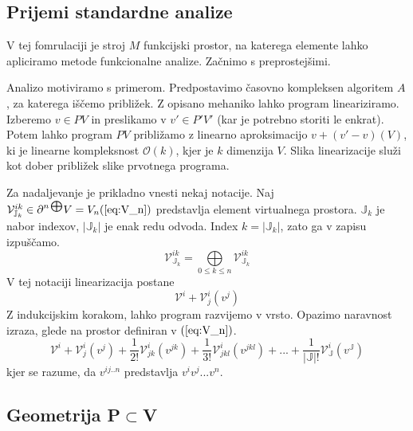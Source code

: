 \documentclass{article}
\newcommand{\JJ}{\mathbb{J}}
\newcommand{\VV}{\mathcal{V}}
\newcommand{\op}[1]{\partial^{#1\bigoplus}}
\begin{document}
 \subsection{Prijemi standardne analize}
 
 V tej fomrulaciji je stroj $M$ funkcijski prostor,  na katerega elemente lahko apliciramo metode funkcionalne analize. Začnimo s preprostejšimi.
 
 Analizo motiviramo s primerom. Predpostavimo časovno kompleksen algoritem $A$, za katerega iščemo približek. Z opisano mehaniko lahko program lineariziramo.
 Izberemo $v\in PV$ in preslikamo v $v'\in P'V'$ (kar je potrebno storiti le enkrat). Potem lahko program $PV$ približamo z linearno aproksimacijo $v+(v'-v) (V)$, ki je linearne kompleksnost $\mathcal{O}(k)$, kjer je $k$ dimenzija $V$.
 Slika linearizacije služi kot dober približek slike prvotnega programa.
 
 
 Za nadaljevanje je prikladno vnesti nekaj notacije. Naj $\VV^{ik}_{\JJ_k}\in\op{n}V=V_n (\ref{eq:V_n})$ predstavlja element virtualnega prostora. $\JJ_k$ je nabor indexov, $\lvert\JJ_k\rvert$ je enak redu odvoda. Index $k=\lvert\JJ_k\rvert$, zato ga v zapisu izpuščamo. 
 \begin{equation}
 	\VV^{ik}_{\JJ_k}= \bigoplus\limits_{0\le k\le n} \VV^{ik}_{\JJ_k}
 \end{equation}
 V tej notaciji linearizacija postane
 \begin{equation}\label{eq:linear}
	\VV^i+\VV^i_j(v^j)
 \end{equation}
 Z indukcijskim korakom, lahko program razvijemo v vrsto. Opazimo naravnost izraza, glede na prostor definiran v $(\ref{eq:V_n})$.
 \begin{equation}\label{eq:vrsta}
 	\VV^i +\VV^i_j(v^j)+\frac{1}{2!}\VV^i_{jk}(v^{jk})+\frac{1}{3!}\VV^i_{jkl}(v^{jkl})+...+\frac{1}{\lvert\JJ\rvert!}\VV^i_\JJ(v^\JJ)
 \end{equation}
kjer se razume, da $v^{ij..n}$ predstavlja $v^iv^j...v^n$. 

\subsection{Geometrija P$\subset$V}
\end{document}
